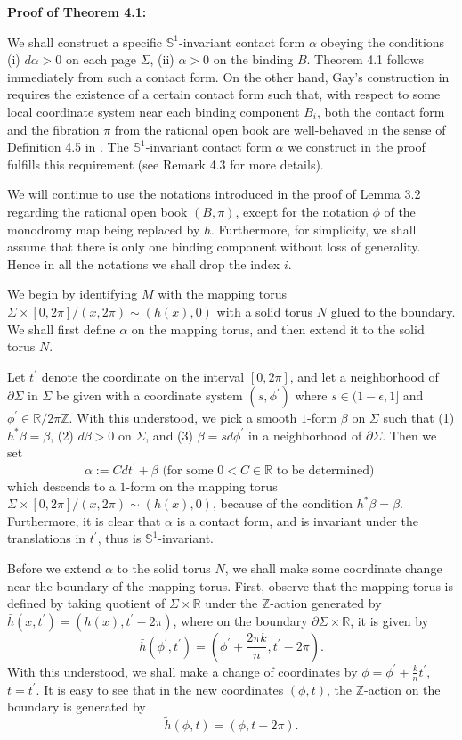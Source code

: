 \documentclass[11pt]{amsart}
\theoremstyle{plain}
\numberwithin{theorem}{section}
\theoremstyle{definition}
\newcommand{\R}{{\mathbb R}}
\newcommand{\Z}{{\mathbb Z}}
\newcommand{\s}{{\mathbb S}}
\begin{document}
{\bf Proof of Theorem 4.1:}

\vspace{2mm}

We shall construct a specific $\s^1$-invariant contact form $\alpha$ obeying the conditions
(i) $d\alpha>0$ on each page $\Sigma$, (ii) $\alpha>0$ on the binding $B$. Theorem 4.1 follows immediately 
from such a contact form. On the other hand, Gay's construction in \cite{G} requires the existence of a certain contact form such that, with respect to some local coordinate system near each binding component $B_i$, both the contact form and the fibration $\pi$ from the rational open book are well-behaved in the sense of Definition 4.5 in \cite{G}. The $\s^1$-invariant contact form $\alpha$ we construct in the proof fulfills this requirement (see Remark 4.3 for more details). 

We will continue to use the notations introduced in the proof of Lemma 3.2 regarding the rational open book $(B,\pi)$, except for the notation $\phi$ of the monodromy map being replaced by $h$. Furthermore, for simplicity,
we shall assume that there is only one binding component without loss of generality. Hence in all the notations we shall drop the index $i$.

We begin by identifying $M$ with the mapping torus $\Sigma\times [0,2\pi]/(x,2\pi)\sim (h(x),0)$ with a
solid torus $N$ glued to the boundary. We shall first define $\alpha$ on the mapping torus, and then extend it to the solid torus $N$. 

Let $t^\prime$ denote the coordinate on the interval $[0,2\pi]$, 
and let a neighborhood of $\partial\Sigma$ in 
$\Sigma$ be given with a coordinate system $(s,\phi^\prime)$ where $s\in (1-\epsilon,1]$ and 
$\phi^\prime\in\R/2\pi\Z$. With this understood, we pick a smooth $1$-form $\beta$ on $\Sigma$
such that (1) $h^\ast \beta=\beta$, (2) $d\beta>0$ on $\Sigma$, and (3) $\beta=sd\phi^\prime$ in
a neighborhood of $\partial\Sigma$. Then we set
$$
\alpha:=Cdt^\prime+\beta \mbox{ (for some $0<C\in\R$ to be determined) }
$$
which descends to a $1$-form on the mapping torus $\Sigma\times [0,2\pi]/(x,2\pi)\sim (h(x),0)$, because 
of the condition $h^\ast \beta=\beta$. Furthermore, it is clear that $\alpha$ is a contact form, and
is invariant under the translations in $t^\prime$, thus is $\s^1$-invariant. 

Before we extend $\alpha$ to the solid torus $N$, we shall make some coordinate change near the
boundary of the mapping torus. First, observe that the mapping torus is defined by taking quotient 
of $\Sigma\times \R$ under the $\Z$-action generated by $\bar{h}(x,t^\prime)=(h(x),t^\prime-2\pi)$,
where on the boundary $\partial\Sigma\times \R$, it is given by 
$$
\bar{h}(\phi^\prime,t^\prime)=(\phi^\prime+\frac{2\pi k}{n},t^\prime-2\pi). 
$$
With this understood, we shall make a change of coordinates by 
$\phi=\phi^\prime+\frac{k}{n}t^\prime$, $t=t^\prime$. It is easy to see that in the new coordinates 
$(\phi,t)$, the $\Z$-action on the boundary is generated by 
$$
\tilde{h}(\phi,t)=(\phi,t-2\pi).
$$
\end{document}
